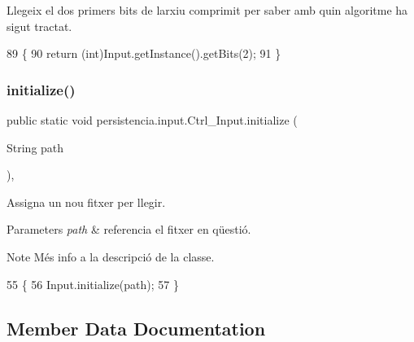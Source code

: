 Llegeix el dos primers bits de l\textquotesingle{}arxiu comprimit per saber amb quin algoritme ha sigut tractat. 


\begin{DoxyCode}
89                              \{
90         \textcolor{keywordflow}{return} (\textcolor{keywordtype}{int})Input.getInstance().getBits(2);
91     \}
\end{DoxyCode}
\mbox{\label{classpersistencia_1_1input_1_1Ctrl__Input_a0b62b5bc05ac4a7fd919a49b201eb4fd}} 
\subsubsection{\texorpdfstring{initialize()}{initialize()}}
{\footnotesize\ttfamily public static void persistencia.\+input.\+Ctrl\+\_\+\+Input.\+initialize (\begin{DoxyParamCaption}\item[{String}]{path }\end{DoxyParamCaption})\hspace{0.3cm}{\ttfamily [inline]}, {\ttfamily [static]}}



Assigna un nou fitxer per llegir. 


\begin{DoxyParams}{Parameters}
{\em path} & referencia el fitxer en qüestió. \\
\hline
\end{DoxyParams}
\begin{DoxyNote}{Note}
Més info a la descripció de la classe. 
\end{DoxyNote}

\begin{DoxyCode}
55                                                \{
56         Input.initialize(path);
57     \}
\end{DoxyCode}


\subsection{Member Data Documentation}
\mbox{\label{classpersistencia_1_1input_1_1Ctrl__Input_a6041b56aa31f01f75d02382f98e259e5}} 
